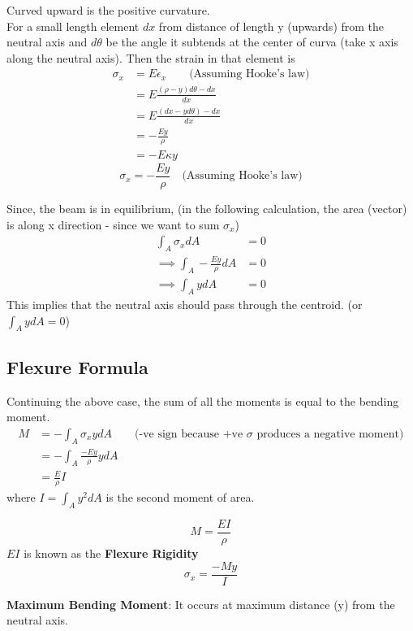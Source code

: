\documentclass{article}
\begin{document}
		Curved upward is the positive curvature.\\

		For a small length element $dx$ from distance of length y (upwards) from the neutral axis and $d\theta$ be the angle it subtends at the center of curva (take x axis along the neutral axis). Then the strain in that element is
		\begin{align*}
			\sigma_x &= E \epsilon_x \qquad \text{(Assuming Hooke's law)}\\
					 &= E \frac{(\rho -y)d\theta - dx}{dx}\\
					 &= E\frac{(dx - yd\theta) - dx}{dx}\\
					 &= -\frac{Ey}{\rho}\\
					 &= -E\kappa y
		\end{align*}	
		\[\boxed{\sigma_x = - \frac{Ey}\rho} \quad \text{(Assuming Hooke's law)}\]	


		Since, the beam is in equilibrium, (in the following calculation, the area (vector) is along x direction - since we want to sum $\sigma_x$)
		\begin{align*}
			\int_A \sigma_x dA &= 0\\
			\implies \int_A -\frac{Ey}{\rho}dA &=0\\
			\implies \int_A ydA &=0
		\end{align*}
		This implies that the neutral axis should pass through the centroid. (or $\int_A ydA = 0$) 

	\subsection{Flexure Formula}
		Continuing the above case, the sum of all the moments is equal to the bending moment.
		\begin{align*}
			M &= - \int_A \sigma_xy dA \qquad \text{(-ve sign because +ve $\sigma$ produces a negative moment)}\\
			  &= - \int_A \frac{-Ey}{\rho} y dA\\
			  &= \frac{E}{\rho} I 
		\end{align*}
		where $I = \int_A y^2 dA$ is the second moment of area.

		\[ {M} = \frac{EI}{\rho} \]
		$EI$ is known as the \textbf{Flexure Rigidity}
		\[\boxed{\sigma_x = \frac{-My}{I}}\]

		\textbf{Maximum Bending Moment}: It occurs at maximum distance (y) from the neutral axis.\\
\end{document}
